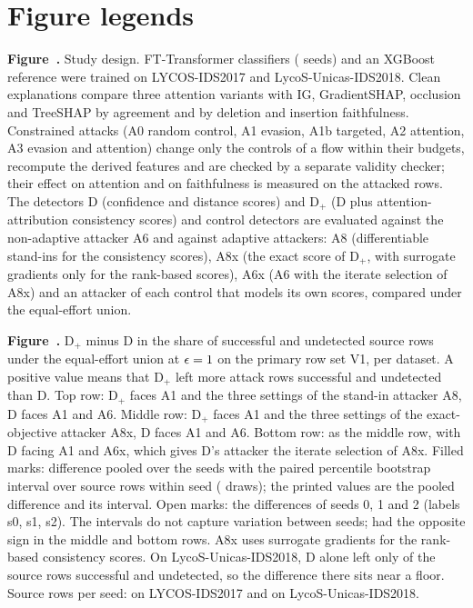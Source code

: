 \section*{Figure legends}
\label{sec:legends}

\noindent\textbf{Figure~\mainFigPipeline.}
Study design.
FT-Transformer classifiers (\nSeeds{} seeds) and an XGBoost reference were trained on LYCOS-IDS2017 and
LycoS-Unicas-IDS2018.
Clean explanations compare three attention variants with IG, GradientSHAP, occlusion and TreeSHAP by agreement and by
deletion and insertion faithfulness.
Constrained attacks (A0 random control, A1 evasion, A1b targeted, A2 attention, A3 evasion and attention) change only
the controls of a flow within their budgets, recompute the derived features and are checked by a separate validity
checker; their effect on attention and on faithfulness is measured on the attacked rows.
The detectors D (confidence and distance scores) and D$_+$ (D plus \nConsistency{} attention-attribution consistency
scores) and \nControlsAll{} control detectors are evaluated against the non-adaptive attacker A6 and against adaptive
attackers: A8 (differentiable stand-ins for the consistency scores), A8x (the exact score of D$_+$, with surrogate
gradients only for the \nRankScores{} rank-based scores), A6x (A6 with the iterate selection of A8x) and an attacker of
each control that models its own scores, compared under the equal-effort union.

\medskip
\noindent\textbf{Figure~\mainFigHeadline.}
D$_+$ minus D in the share of successful and undetected source rows under the equal-effort union at
$\epsilon = 1$ on the primary row set V1, per dataset.
A positive value means that D$_+$ left more attack rows successful and undetected than D.
Top row: D$_+$ faces A1 and the three settings of the stand-in attacker A8, D faces A1 and A6.
Middle row: D$_+$ faces A1 and the three settings of the exact-objective attacker A8x, D faces A1 and A6.
Bottom row: as the middle row, with D facing A1 and A6x, which gives D's attacker the iterate selection of A8x.
Filled marks: difference pooled over the \nSeeds{} seeds with the \paramCILevel{} paired percentile bootstrap interval
over source rows within seed (\paramBoot{} draws); the printed values are the pooled difference and its interval.
Open marks: the differences of seeds 0, 1 and 2 (labels s0, s1, s2).
The intervals do not capture variation between seeds; \axHeadOppSeedsPhrase{} had the opposite sign in the middle and bottom rows.
A8x uses surrogate gradients for the \nRankScores{} rank-based consistency scores.
On LycoS-Unicas-IDS2018, D alone left only \axHeadVoneEighteenD{} of the source rows successful and undetected, so the
difference there sits near a floor.
Source rows per seed: \nSrcVoneSeventeen{} on LYCOS-IDS2017 and \nSrcVoneEighteen{} on LycoS-Unicas-IDS2018.
